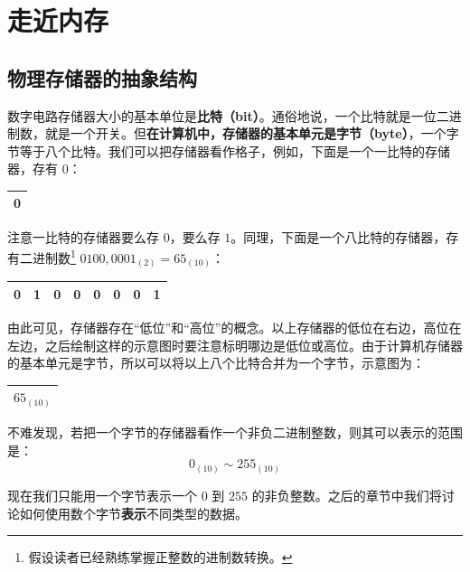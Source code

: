 
\section{走近内存}

\subsection{物理存储器的抽象结构}

数字电路存储器大小的基本单位是\textbf{比特（bit）}。通俗地说，一个比特就是一位二进制数，就是一个开关。但\textbf{在计算机中，存储器的基本单元是字节（byte）}，一个字节等于八个比特。我们可以把存储器看作格子，例如，下面是一个一比特的存储器，存有 $0$：
\begin{table}[H]
	\centering
	\begin{tabular}{|c|}
		\hline
		0
		\\\hline
	\end{tabular}
\end{table}

注意一比特的存储器要么存 $0$，要么存 $1$。同理，下面是一个八比特的存储器，存有二进制数\footnote{假设读者已经熟练掌握正整数的进制数转换。} $0100,0001_{(2)} = 65_{(10)}$：
\begin{table}[H]
	\centering
	\begin{tabular}{|c|c|c|c|c|c|c|c|}
		\hline
		0 & 1 & 0 & 0 & 0 & 0 & 0 & 1
		\\\hline
	\end{tabular}
\end{table}

由此可见，存储器存在“低位”和“高位”的概念。以上存储器的低位在右边，高位在左边，之后绘制这样的示意图时要注意标明哪边是低位或高位。由于计算机存储器的基本单元是字节，所以可以将以上八个比特合并为一个字节，示意图为：
\begin{table}[H]
	\centering
	\begin{tabular}{|c|}
		\hline
		$65_{(10)}$
		\\\hline
	\end{tabular}
\end{table}

不难发现，若把一个字节的存储器看作一个非负二进制整数，则其可以表示的范围是：
$$
0_{(10)} \sim 255_{(10)}
$$

现在我们只能用一个字节表示一个 $0$ 到 $255$ 的非负整数。之后的章节中我们将讨论如何使用数个字节\textbf{表示}不同类型的数据。

